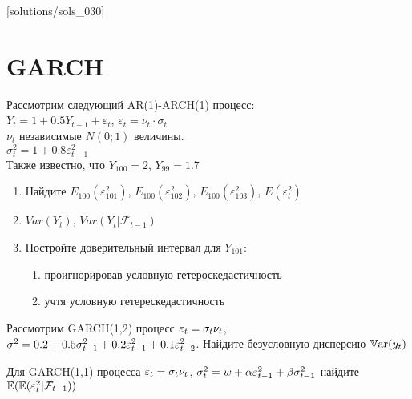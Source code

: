 [solutions/sols_030]

\chapter{GARCH}



\begin{problem}
Рассмотрим следующий AR(1)-ARCH(1) процесс: \\
$Y_{t}=1+0.5Y_{t-1}+\varepsilon_{t}$, $\varepsilon_{t}=\nu_{t}\cdot \sigma_{t}$ \\
$\nu_{t}$ независимые $N(0;1)$ величины. \\
$\sigma^{2}_{t}=1+0.8\varepsilon^{2}_{t-1}$\\
Также известно, что $Y_{100}=2$, $Y_{99}=1.7$
\begin{enumerate}
\item Найдите $E_{100}(\varepsilon^{2}_{101})$, $E_{100}(\varepsilon^{2}_{102})$, $E_{100}(\varepsilon^{2}_{103})$, $E(\varepsilon^{2}_{t})$
\item $Var(Y_{t})$, $Var(Y_{t}|\mathcal{F}_{t-1})$
\item Постройте доверительный интервал для $Y_{101}$:
\begin{enumerate}
\item проигнорировав условную гетероскедастичность
\item учтя условную гетерескедастичность
\end{enumerate}
\end{enumerate}
\begin{sol}
\end{sol}
\end{problem}




\begin{problem}
Рассмотрим GARCH(1,2) процесс $\varepsilon_t=\sigma_t \nu_t$, $\sigma^2=0.2+0.5\sigma^2_{t-1}+0.2\varepsilon_{t-1}^2+0.1\varepsilon_{t-2}^2$. Найдите безусловную дисперсию $\mathbb{V}\mathrm{ar}(y_t)$
\begin{sol}

\end{sol}
\end{problem}


\begin{problem}
Для GARCH(1,1) процесса $\varepsilon_t=\sigma_t \nu_t$, $\sigma^2_{t}= w + \alpha \varepsilon_{t-1}^2+ \beta \sigma^2_{t-1}$ найдите $\mathbb{E}( \mathbb{E}(\varepsilon_t^2 | \mathcal{F}_{t-1} ) )$
\begin{sol}

\end{sol}
\end{problem}



